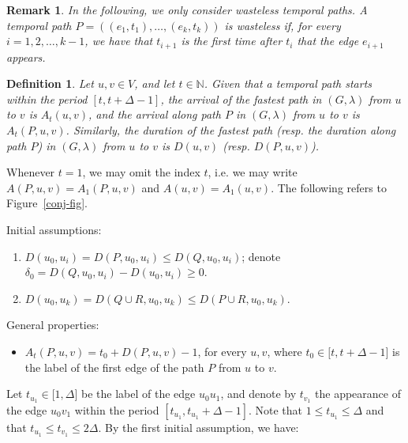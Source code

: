 \documentclass{article}
\newtheorem{definition}{Definition}
\newtheorem{remark}{Remark}
\begin{document}
\begin{remark}
In the following, we only consider \emph{wasteless} temporal paths. A
temporal path $P=((e_{1},t_{1}),\ldots ,(e_{k},t_{k}))$ is \emph{wasteless}
if, for every $i=1,2,\ldots ,k-1$, we have that $t_{i+1}$ is the first time
after $t_{i}$ that the edge $e_{i+1}$ appears.
\end{remark}

\begin{definition}
\label{arrival-duration-def}Let $u,v\in V$, and let $t\in 
\mathbb{N}
$. Given that a temporal path starts within the period $[t,t+\Delta -1]$,
the \emph{arrival} of the fastest path in $(G,\lambda )$ from $u$ to $v$ is $%
A_{t}(u,v)$, and the \emph{arrival} along path $P$ in $(G,\lambda )$ from $u$
to $v$ is $A_{t}(P,u,v)$. Similarly, the \emph{duration} of the fastest path
(resp. the \emph{duration} along path $P$) in $(G,\lambda )$ from $u$ to $v$
is $D(u,v)$ (resp. $D(P,u,v)$).
\end{definition}

Whenever $t=1$, we may omit the index $t$, i.e. we may write $%
A(P,u,v)=A_{1}(P,u,v)$ and $A(u,v)=A_{1}(u,v)$. The following refers to
Figure~\ref{conj-fig}.

Initial assumptions:

\begin{enumerate}
\item $D(u_{0},u_{i})=D(P,u_{0},u_{i})\leq D(Q,u_{0},u_{i})$; denote $\delta
_{0}=D(Q,u_{0},u_{i})-D(u_{0},u_{i})\geq 0$.

\item $D(u_{0},u_{k})=D(Q\cup R,u_{0},u_{k})\leq D(P\cup R,u_{0},u_{k})$.
\end{enumerate}

General properties:

\begin{itemize}
\item $A_{t}(P,u,v)=t_{0}+D(P,u,v)-1$, for every $u,v$, where $t_{0}\in
\lbrack t,t+\Delta -1]$ is the label of the first edge of the path $P$ from $%
u$ to $v$.
\end{itemize}

\bigskip

Let $t_{u_{1}}\in \lbrack 1,\Delta ]$ be the label of the edge $u_{0}u_{1}$,
and denote by $t_{v_{1}}$ the appearance of the edge $u_{0}v_{1}$ within the
period $[t_{u_{1}},t_{u_{1}}+\Delta -1]$. Note that $1\leq t_{u_{1}}\leq
\Delta $ and that $t_{u_{1}}\leq t_{v_{1}}\leq 2\Delta $. By the first
initial assumption, we have:
\end{document}
